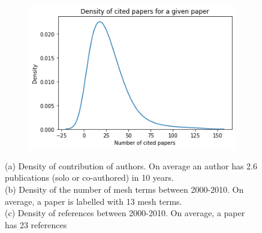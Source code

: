 \begin{figure}[H]
\begin{subfigure}{.5\textwidth}
  \includegraphics[width=1\linewidth]{3_chapter3/figures/density_cited_paper.png}
  \caption{}
  \label{fig:sub3}
\end{subfigure}
\caption[Density of number of authors, meshterms and references]{\justifying (a) Density of contribution of authors. On average an author has 2.6 publications (solo or co-authored) in 10 years. \\ (b) Density of the number of mesh terms between 2000-2010. On average, a paper is labelled with 13 mesh terms. \\(c) Density of references between 2000-2010. On average, a paper has 23 references }
\label{fig:10}
\end{figure}

